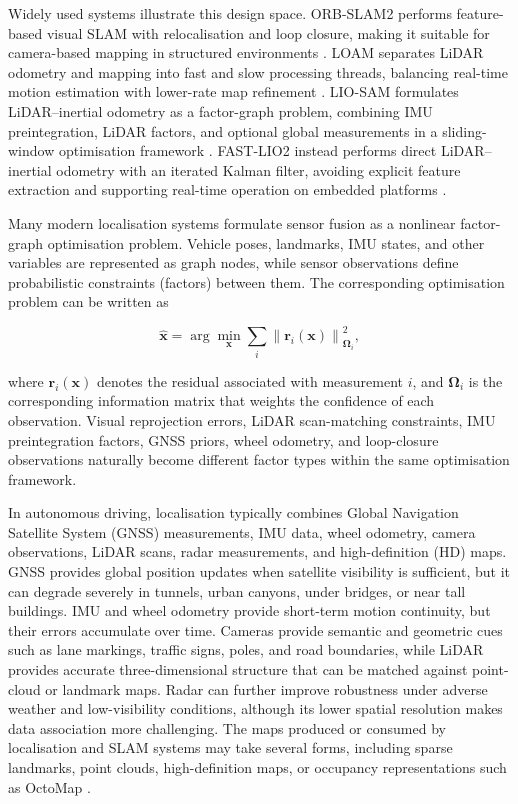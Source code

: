 \documentclass{ieeeaccess}
\begin{document}
Widely used systems illustrate this design space. ORB-SLAM2 performs feature-based visual SLAM with relocalisation and loop closure, making it suitable for camera-based mapping in structured environments \cite{murartal2017_orbslam2}. LOAM separates LiDAR odometry and mapping into fast and slow processing threads, balancing real-time motion estimation with lower-rate map refinement \cite{zhang2014_loam}. LIO-SAM formulates LiDAR--inertial odometry as a factor-graph problem, combining IMU preintegration, LiDAR factors, and optional global measurements in a sliding-window optimisation framework \cite{shan2020_liosam}. FAST-LIO2 instead performs direct LiDAR--inertial odometry with an iterated Kalman filter, avoiding explicit feature extraction and supporting real-time operation on embedded platforms \cite{xu2022_fastlio2}.

Many modern localisation systems formulate sensor fusion as a nonlinear factor-graph optimisation problem. Vehicle poses, landmarks, IMU states, and other variables are represented as graph nodes, while sensor observations define probabilistic constraints (factors) between them. The corresponding optimisation problem can be written as

\begin{equation}
\hat{\mathbf{x}}
=
\arg\min_{\mathbf{x}}
\sum_i
\left\|
\mathbf{r}_i(\mathbf{x})
\right\|_{\mathbf{\Omega}_i}^{2},
\label{eq:factor_graph}
\end{equation}

where $\mathbf{r}_i(\mathbf{x})$ denotes the residual associated with measurement $i$, and $\mathbf{\Omega}_i$ is the corresponding information matrix that weights the confidence of each observation. Visual reprojection errors, LiDAR scan-matching constraints, IMU preintegration factors, GNSS priors, wheel odometry, and loop-closure observations naturally become different factor types within the same optimisation framework.

In autonomous driving, localisation typically combines Global Navigation Satellite System (GNSS) measurements, IMU data, wheel odometry, camera observations, LiDAR scans, radar measurements, and high-definition (HD) maps. GNSS provides global position updates when satellite visibility is sufficient, but it can degrade severely in tunnels, urban canyons, under bridges, or near tall buildings. IMU and wheel odometry provide short-term motion continuity, but their errors accumulate over time. Cameras provide semantic and geometric cues such as lane markings, traffic signs, poles, and road boundaries, while LiDAR provides accurate three-dimensional structure that can be matched against point-cloud or landmark maps. Radar can further improve robustness under adverse weather and low-visibility conditions, although its lower spatial resolution makes data association more challenging. The maps produced or consumed by localisation and SLAM systems may take several forms, including sparse landmarks, point clouds, high-definition maps, or occupancy representations such as OctoMap \cite{hornung2013_octomap}.
\end{document}
